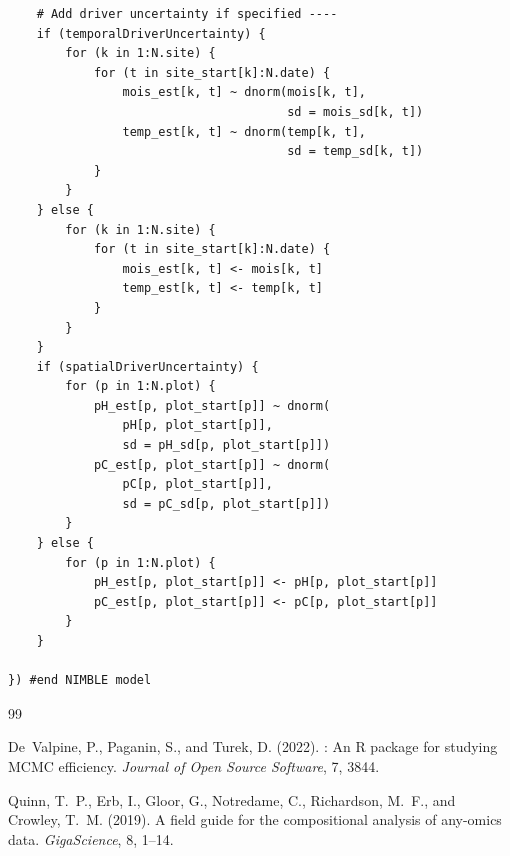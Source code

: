 \documentclass[11pt]{article}
\begin{document}
\begin{lstlisting}
    # Add driver uncertainty if specified ----
    if (temporalDriverUncertainty) {
        for (k in 1:N.site) {
            for (t in site_start[k]:N.date) {
                mois_est[k, t] ~ dnorm(mois[k, t],
                                       sd = mois_sd[k, t])
                temp_est[k, t] ~ dnorm(temp[k, t],
                                       sd = temp_sd[k, t])
            }
        }
    } else {
        for (k in 1:N.site) {
            for (t in site_start[k]:N.date) {
                mois_est[k, t] <- mois[k, t]
                temp_est[k, t] <- temp[k, t]
            }
        }
    }
    if (spatialDriverUncertainty) {
        for (p in 1:N.plot) {
            pH_est[p, plot_start[p]] ~ dnorm(
                pH[p, plot_start[p]],
                sd = pH_sd[p, plot_start[p]])
            pC_est[p, plot_start[p]] ~ dnorm(
                pC[p, plot_start[p]],
                sd = pC_sd[p, plot_start[p]])
        }
    } else {
        for (p in 1:N.plot) {
            pH_est[p, plot_start[p]] <- pH[p, plot_start[p]]
            pC_est[p, plot_start[p]] <- pC[p, plot_start[p]]
        }
    }

}) #end NIMBLE model
\end{lstlisting}


\begin{thebibliography}{99}

De~Valpine, P., Paganin, S., and Turek, D. (2022).
: An {R} package for studying {MCMC} efficiency.
\newblock \textit{Journal of Open Source Software}, 7, 3844.

Quinn, T.~P., Erb, I., Gloor, G., Notredame, C., Richardson, M.~F., and Crowley, T.~M. (2019).
\newblock A field guide for the compositional analysis of any-omics data.
\newblock \textit{GigaScience}, 8, 1--14.

\end{thebibliography}
\end{document}
